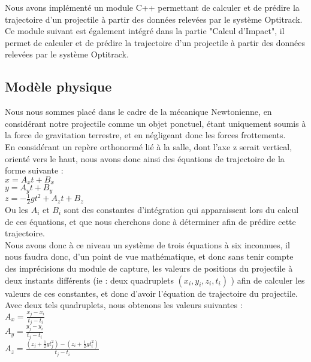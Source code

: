 Nous avons implémenté un module C++ permettant de calculer et de prédire la trajectoire d'un projectile à partir des données relevées par le système Optitrack. Ce module suivant est également intégré dans la partie "Calcul d'Impact", il permet de calculer et de prédire la trajectoire d'un projectile à partir des données relevées par le système Optitrack.

\subsection{Modèle physique}

Nous nous sommes placé dans le cadre de la mécanique Newtonienne, en considérant notre projectile comme un objet ponctuel, étant uniquement soumis à la force de gravitation terrestre, et en négligeant donc les forces frottements.\\

En considérant un repère orthonormé lié à la salle, dont l'axe z serait vertical, orienté vers le haut, nous avons donc ainsi des équations de trajectoire de la forme suivante :\\

$x = A_xt + B_x$\\

$y = A_yt + B_y$\\

$z = -\frac{1}{2} g t^2 + A_zt + B_z$\\

Ou les $A_i$ et $B_i$ sont des constantes d'intégration qui apparaissent lors du calcul de ces équations, et que nous cherchons donc à déterminer afin de prédire cette trajectoire.\\

Nous avons donc à ce niveau un système de trois équations à six inconnues, il nous faudra donc, d'un point de vue mathématique, et donc sans tenir compte des imprécisions du module de capture, les valeurs de positions du projectile à deux instants différents (ie : deux quadruplets $(x_i, y_i, z_i, t_i)$ ) afin de calculer les valeurs de ces constantes, et donc d'avoir l'équation de trajectoire du projectile.
\newpage
Avec deux tels quadruplets, nous obtenons les valeurs suivantes :\\

$A_x = \frac{x_j-x_i}{t_j-t_i}$\\

$A_y = \frac{y_j-y_i}{t_j-t_i}$\\

$A_z = \frac{(z_j + \frac{1}{2} g t_j^2)-(z_i + \frac{1}{2} g t_i^2)}{t_j-t_i}$\\

